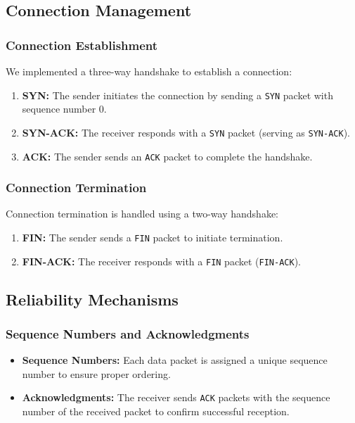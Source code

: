 \documentclass[11pt]{article}
\begin{document}
\subsection{Connection Management}

\subsubsection{Connection Establishment}

We implemented a three-way handshake to establish a connection:

\begin{enumerate}
    \item \textbf{SYN:} The sender initiates the connection by sending a \texttt{SYN} packet with sequence number 0.
    \item \textbf{SYN-ACK:} The receiver responds with a \texttt{SYN} packet (serving as \texttt{SYN-ACK}).
    \item \textbf{ACK:} The sender sends an \texttt{ACK} packet to complete the handshake.
\end{enumerate}

\subsubsection{Connection Termination}

Connection termination is handled using a two-way handshake:

\begin{enumerate}
    \item \textbf{FIN:} The sender sends a \texttt{FIN} packet to initiate termination.
    \item \textbf{FIN-ACK:} The receiver responds with a \texttt{FIN} packet (\texttt{FIN-ACK}).
\end{enumerate}

\subsection{Reliability Mechanisms}

\subsubsection{Sequence Numbers and Acknowledgments}

\begin{itemize}
    \item \textbf{Sequence Numbers:} Each data packet is assigned a unique sequence number to ensure proper ordering.
    \item \textbf{Acknowledgments:} The receiver sends \texttt{ACK} packets with the sequence number of the received packet to confirm successful reception.
\end{itemize}
\end{document}
